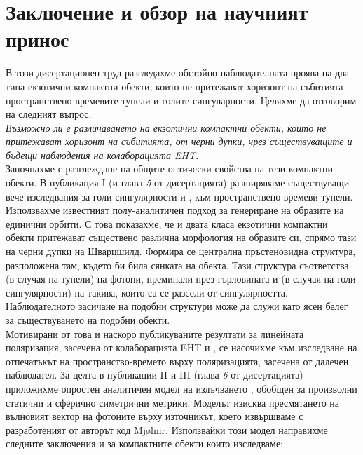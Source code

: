 \section{Заключение и обзор на научният принос}

В този дисертационен труд разгледахме обстойно наблюдателната проява на два типа екзотични компактни обекти, които не притежават хоризонт на събитията - пространствено-времевите тунели и голите сингуларности. Целяхме да отговорим на следният въпрос:\\

\emph{Възможно ли е различаването на екзотични компактни обекти, които не притежават хоризонт на събитията, от черни дупки, чрез съществуващите и бъдещи наблюдения на колаборацията EHT.}\\

Започнахме с разглеждане на общите оптически свойства на тези компактни обекти. В публикация I (и глава \emph{5} от дисертацията) разширяваме съществуващи вече изследвания за голи сингулярности \cite{Gyulchev2020} и \cite{Gyulchev2021}, към пространствено-времеви тунели. Използвахме известният полу-аналитичен подход \cite{Muller2009} за генериране на образите на единични орбити. С това показахме, че и двата класа екзотични компактни обекти притежават съществено различна морфология на образите си, спрямо тази на черни дупки на Шварцшилд. Формира се централна пръстеновидна структура, разположена там, където би била сянката на обекта. Тази структура съответства (в случая на тунели) на фотони, преминали през гърловината и (в случая на голи сингулярности) на такива, които са се разсели от сингулярността. Наблюдателното засичане на подобни структури може да служи като ясен белег за съществуването на подобни обекти.\\

Мотивирани от това и наскоро публикуваните резултати за линейната поляризация, засечена от колаборацията EHT \cite{EHT_M87_VII} и \cite{EHT_M87_VIII}, се насочихме към изследване на отпечатъкът на пространство-времето върху поляризацията, засечена от далечен наблюдател. За целта в публикации II и III (глава \emph{6} от дисертацията) приложихме опростен аналитичен модел на излъчването \cite{Narayan2021}, обобщен за произволни статични и сферично симетрични метрики. Моделът изисква пресмятането на вълновият вектор на фотоните върху източникът, което извършваме с разработеният от авторът код Mjølnir. Използвайки този модел направихме следните заключения и за компактните обекти които изследваме:\\

